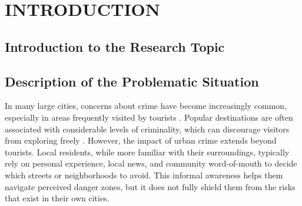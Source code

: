 \chapter{INTRODUCTION} 


\section{Introduction to the Research Topic} %


\section{Description of the Problematic Situation}

In many large cities, concerns about crime have become increasingly common, especially in areas frequently visited by tourists \cite{SopikoTevdoradze2024CrimeTourism}. Popular destinations are often associated with considerable levels of criminality, which can discourage visitors from exploring freely \cite{Machado2012CrimeRJ}. However, the impact of urban crime extends beyond tourists. Local residents, while more familiar with their surroundings, typically rely on personal experience, local news, and community word-of-mouth to decide which streets or neighborhoods to avoid. This informal awareness helps them navigate perceived danger zones, but it does not fully shield them from the risks that exist in their own cities.



